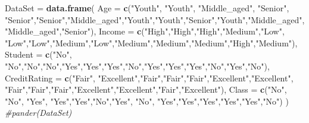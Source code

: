 \documentclass[
]{book}
\newenvironment{Shaded}{\begin{snugshade}}{\end{snugshade}}
\newcommand{\AttributeTok}[1]{\textcolor[rgb]{0.13,0.29,0.53}{#1}}
\newcommand{\CommentTok}[1]{\textcolor[rgb]{0.56,0.35,0.01}{\textit{#1}}}
\newcommand{\FunctionTok}[1]{\textcolor[rgb]{0.13,0.29,0.53}{\textbf{#1}}}
\newcommand{\NormalTok}[1]{#1}
\newcommand{\OtherTok}[1]{\textcolor[rgb]{0.56,0.35,0.01}{#1}}
\newcommand{\StringTok}[1]{\textcolor[rgb]{0.31,0.60,0.02}{#1}}
\begin{document}
\begin{Shaded}
\begin{Highlighting}[]
\NormalTok{DataSet }\OtherTok{=} \FunctionTok{data.frame}\NormalTok{(}
\AttributeTok{Age =} \FunctionTok{c}\NormalTok{(}\StringTok{"Youth"}\NormalTok{, }\StringTok{"Youth"}\NormalTok{, }\StringTok{"Middle\_aged"}\NormalTok{, }\StringTok{"Senior"}\NormalTok{, }\StringTok{"Senior"}\NormalTok{,}\StringTok{"Senior"}\NormalTok{,}\StringTok{"Middle\_aged"}\NormalTok{,}\StringTok{"Youth"}\NormalTok{,}\StringTok{"Youth"}\NormalTok{,}\StringTok{"Senior"}\NormalTok{,}\StringTok{"Youth"}\NormalTok{,}\StringTok{"Middle\_aged"}\NormalTok{,}
        \StringTok{"Middle\_aged"}\NormalTok{,}\StringTok{"Senior"}\NormalTok{),}
\AttributeTok{Income =} \FunctionTok{c}\NormalTok{(}\StringTok{"High"}\NormalTok{,}\StringTok{"High"}\NormalTok{,}\StringTok{"High"}\NormalTok{,}\StringTok{"Medium"}\NormalTok{,}\StringTok{"Low"}\NormalTok{, }\StringTok{"Low"}\NormalTok{,}\StringTok{"Low"}\NormalTok{,}\StringTok{"Medium"}\NormalTok{,}\StringTok{"Low"}\NormalTok{,}\StringTok{"Medium"}\NormalTok{,}\StringTok{"Medium"}\NormalTok{,}\StringTok{"Medium"}\NormalTok{,}\StringTok{"High"}\NormalTok{,}\StringTok{"Medium"}\NormalTok{),}
\AttributeTok{Student =} \FunctionTok{c}\NormalTok{(}\StringTok{"No"}\NormalTok{, }\StringTok{"No"}\NormalTok{,}\StringTok{"No"}\NormalTok{,}\StringTok{"No"}\NormalTok{,}\StringTok{"Yes"}\NormalTok{,}\StringTok{"Yes"}\NormalTok{,}\StringTok{"Yes"}\NormalTok{,}\StringTok{"No"}\NormalTok{,}\StringTok{"Yes"}\NormalTok{,}\StringTok{"Yes"}\NormalTok{,}\StringTok{"Yes"}\NormalTok{,}\StringTok{"No"}\NormalTok{,}\StringTok{"Yes"}\NormalTok{,}\StringTok{"No"}\NormalTok{),}
\AttributeTok{CreditRating =} \FunctionTok{c}\NormalTok{(}\StringTok{"Fair"}\NormalTok{, }\StringTok{"Excellent"}\NormalTok{,}\StringTok{"Fair"}\NormalTok{,}\StringTok{"Fair"}\NormalTok{,}\StringTok{"Fair"}\NormalTok{,}\StringTok{"Excellent"}\NormalTok{,}\StringTok{"Excellent"}\NormalTok{,}
                 \StringTok{"Fair"}\NormalTok{,}\StringTok{"Fair"}\NormalTok{,}\StringTok{"Fair"}\NormalTok{,}\StringTok{"Excellent"}\NormalTok{,}\StringTok{"Excellent"}\NormalTok{,}\StringTok{"Fair"}\NormalTok{,}\StringTok{"Excellent"}\NormalTok{),}
\AttributeTok{Class =} \FunctionTok{c}\NormalTok{(}\StringTok{"No"}\NormalTok{, }\StringTok{"No"}\NormalTok{, }\StringTok{"Yes"}\NormalTok{, }\StringTok{"Yes"}\NormalTok{,}\StringTok{"Yes"}\NormalTok{,}\StringTok{"No"}\NormalTok{,}\StringTok{"Yes"}\NormalTok{, }\StringTok{"No"}\NormalTok{, }\StringTok{"Yes"}\NormalTok{,}\StringTok{"Yes"}\NormalTok{,}\StringTok{"Yes"}\NormalTok{,}\StringTok{"Yes"}\NormalTok{,}\StringTok{"Yes"}\NormalTok{,}\StringTok{"No"}\NormalTok{)}
\NormalTok{)}
\CommentTok{\#pander(DataSet)}
\end{Highlighting}
\end{Shaded}
\end{document}
